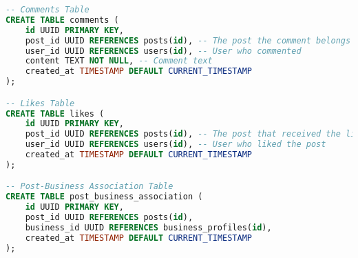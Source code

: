 \begin{lstlisting}[language=SQL]
-- Comments Table
CREATE TABLE comments (
    id UUID PRIMARY KEY,
    post_id UUID REFERENCES posts(id), -- The post the comment belongs to
    user_id UUID REFERENCES users(id), -- User who commented
    content TEXT NOT NULL, -- Comment text
    created_at TIMESTAMP DEFAULT CURRENT_TIMESTAMP
);

-- Likes Table
CREATE TABLE likes (
    id UUID PRIMARY KEY,
    post_id UUID REFERENCES posts(id), -- The post that received the like
    user_id UUID REFERENCES users(id), -- User who liked the post
    created_at TIMESTAMP DEFAULT CURRENT_TIMESTAMP
);

-- Post-Business Association Table
CREATE TABLE post_business_association (
    id UUID PRIMARY KEY,
    post_id UUID REFERENCES posts(id),
    business_id UUID REFERENCES business_profiles(id),
    created_at TIMESTAMP DEFAULT CURRENT_TIMESTAMP
);


\end{lstlisting}

